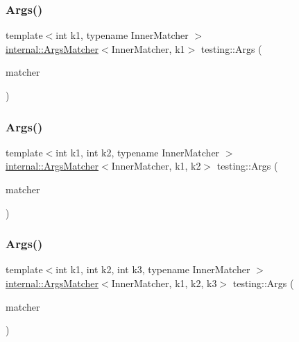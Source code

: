 \mbox{\label{namespacetesting_af67bac6da407df7586f60cfa2c9b602d}} 
\subsubsection{\texorpdfstring{Args()}{Args()}\hspace{0.1cm}{\footnotesize\ttfamily [2/11]}}
{\footnotesize\ttfamily template$<$int k1, typename Inner\+Matcher $>$ \\
\mbox{\hyperlink{classtesting_1_1internal_1_1ArgsMatcher}{internal\+::\+Args\+Matcher}}$<$Inner\+Matcher, k1$>$ testing\+::\+Args (\begin{DoxyParamCaption}\item[{const Inner\+Matcher \&}]{matcher }\end{DoxyParamCaption})\hspace{0.3cm}{\ttfamily [inline]}}

\mbox{\label{namespacetesting_a663409e441584c81f496e9c98fd3453c}} 
\subsubsection{\texorpdfstring{Args()}{Args()}\hspace{0.1cm}{\footnotesize\ttfamily [3/11]}}
{\footnotesize\ttfamily template$<$int k1, int k2, typename Inner\+Matcher $>$ \\
\mbox{\hyperlink{classtesting_1_1internal_1_1ArgsMatcher}{internal\+::\+Args\+Matcher}}$<$Inner\+Matcher, k1, k2$>$ testing\+::\+Args (\begin{DoxyParamCaption}\item[{const Inner\+Matcher \&}]{matcher }\end{DoxyParamCaption})\hspace{0.3cm}{\ttfamily [inline]}}

\mbox{\label{namespacetesting_abd3ddae153e1c452b7625808cc4d820b}} 
\subsubsection{\texorpdfstring{Args()}{Args()}\hspace{0.1cm}{\footnotesize\ttfamily [4/11]}}
{\footnotesize\ttfamily template$<$int k1, int k2, int k3, typename Inner\+Matcher $>$ \\
\mbox{\hyperlink{classtesting_1_1internal_1_1ArgsMatcher}{internal\+::\+Args\+Matcher}}$<$Inner\+Matcher, k1, k2, k3$>$ testing\+::\+Args (\begin{DoxyParamCaption}\item[{const Inner\+Matcher \&}]{matcher }\end{DoxyParamCaption})\hspace{0.3cm}{\ttfamily [inline]}}

